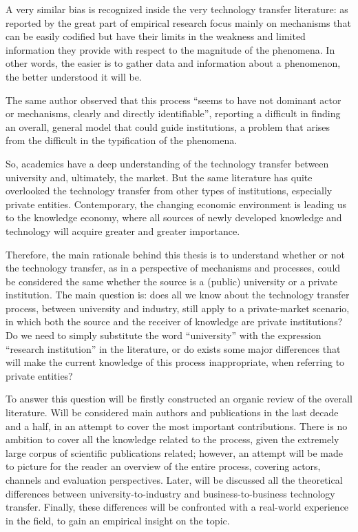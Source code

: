 A very similar bias is recognized inside the very technology transfer literature: as reported by \citet{Muscio2008} the great part of empirical research focus mainly on mechanisms that can be easily codified but have their limits in the weakness and limited information they provide with respect to the magnitude of the phenomena. In other words, the easier is to gather data and information about a phenomenon, the better understood it will be. 

The same author observed that this process \enquote{seems to have not dominant actor or mechanisms, clearly and directly identifiable}, reporting a difficult in finding an overall, general model that could guide institutions, a problem that arises from the difficult in the typification of the phenomena.

So, academics have a deep understanding of the technology transfer between university and, ultimately, the market. But the same literature has quite overlooked the technology transfer from other types of institutions, especially private entities. Contemporary, the changing economic environment is leading us to the knowledge economy, where all sources of newly developed knowledge and technology will acquire greater and greater importance. 

Therefore, the main rationale behind this thesis is to understand whether or not the technology transfer, as in a perspective of mechanisms and processes, could be considered the same whether the source is a (public) university or a private institution. The main question is: does all we know about the technology transfer process, between university and industry, still apply to a private-market scenario, in which both the source and the receiver of knowledge are private institutions? Do we need to simply substitute the word \enquote{university} with the expression \enquote{research institution} in the literature, or do exists some major differences that will make the current knowledge of this process inappropriate, when referring to private entities?

To answer this question will be firstly constructed an organic review of the overall literature. Will be considered main authors and publications in the last decade and a half, in an attempt to cover the most important contributions. There is no ambition to cover all the knowledge related to the process, given the extremely large corpus of scientific publications related; however, an attempt will be made to picture for the reader an overview of the entire process, covering actors, channels and evaluation perspectives. Later, will be discussed all the theoretical differences between university-to-industry and business-to-business technology transfer. Finally, these differences will be confronted with a real-world experience in the field, to gain an empirical insight on the topic.
